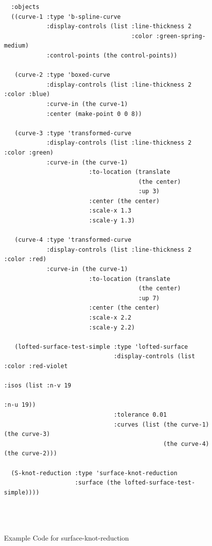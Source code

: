 \documentclass [11pt]{book}
\begin{document}
\begin{itemize}
\begin{figure}
\begin{lrbox}{\boxedverb}
\begin{minipage}{\linewidth}
{\begin{verbatim}
  :objects
  ((curve-1 :type 'b-spline-curve
            :display-controls (list :line-thickness 2 
                                    :color :green-spring-medium)
            :control-points (the control-points))

   (curve-2 :type 'boxed-curve 
            :display-controls (list :line-thickness 2 :color :blue)
            :curve-in (the curve-1)
            :center (make-point 0 0 8))

   (curve-3 :type 'transformed-curve
            :display-controls (list :line-thickness 2 :color :green)
            :curve-in (the curve-1)
                        :to-location (translate 
                                      (the center) 
                                      :up 3)
                        :center (the center)
                        :scale-x 1.3
                        :scale-y 1.3)
   
   (curve-4 :type 'transformed-curve
            :display-controls (list :line-thickness 2 :color :red)
            :curve-in (the curve-1)
                        :to-location (translate 
                                      (the center) 
                                      :up 7)
                        :center (the center)
                        :scale-x 2.2
                        :scale-y 2.2)
  
   (lofted-surface-test-simple :type 'lofted-surface
                               :display-controls (list :color :red-violet 
                                                       :isos (list :n-v 19 
                                                                   :n-u 19))
                               :tolerance 0.01
                               :curves (list (the curve-1) (the curve-3)
                                             (the curve-4) (the curve-2)))  

  (S-knot-reduction :type 'surface-knot-reduction
                    :surface (the lofted-surface-test-simple))))


 
\end{verbatim}}
\end{minipage}
\end{lrbox}
\fbox{\usebox{\boxedverb}}

\caption{Example Code for surface-knot-reduction}

\label{fig:example-code-surface-knot-reduction}

\end{figure}






\end{itemize}
\end{document}
